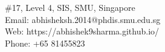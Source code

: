 \begin{minipage}[t]{0.495\textwidth}
	\#17, Level 4, SIS, SMU, Singapore\\
	Email: abhisheksh.2014@phdis.smu.edu.sg \\
	Web: https://abhishek9sharma.github.io/ \\
	Phone: +65 81455823
\end{minipage}